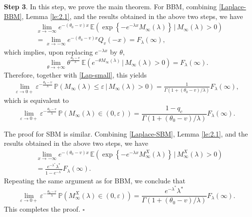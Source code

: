 \documentclass[11pt]{article}
\numberwithin{equation}{section}
\def\qed{\hfill$\square$\smallskip}
\begin{document}
{\bf Step 3}. In this step, we prove the main theorem. For BBM, combining \eqref{Laplace-BBM}, Lemma \ref{le:2.1}, and the results obtained in the above two steps, we have
\begin{align*}
	&\lim_{x \to -\infty} e^{-(\theta_0 - v)x} \, \mathbb{E}\left( \exp\left\{ -e^{-\lambda x} M_\infty(\lambda) \right\} \,\Big|\, M_\infty(\lambda) > 0 \right) \\
	&= 
	\lim_{x \to -\infty} e^{-(\theta_0 - v)x} Q_v(-x)=F_\lambda(\infty),
\end{align*}
which implies, upon replacing $e^{-\lambda x}$ by $\theta$,
\[
\lim_{\theta \to +\infty} \theta^{\frac{\theta_0 - v}{\lambda}} \, \mathbb{E}\left( e^{-\theta M_\infty(\lambda)} \,\Big|\, M_\infty(\lambda) > 0 \right)
=
F_\lambda(\infty).
\]
Therefore, together with \eqref{Lap-small}, this yields
\begin{align*}
	\lim_{\varepsilon \to 0+} \varepsilon^{-\frac{\theta_0 - v}{\lambda}} \, \mathbb{P}\left( M_\infty(\lambda) \leq \varepsilon \,\big|\, M_\infty(\lambda) > 0 \right)
	= 
	\frac{1}{\Gamma(1 + (\theta_0-v)/\lambda)}
	F_\lambda(\infty),
\end{align*}
which is equivalent to
\[
\lim_{\varepsilon \to 0+} \varepsilon^{-\frac{\theta_0 - v}{\lambda}} \, \mathbb{P}\left( M_\infty(\lambda) \in (0, \varepsilon) \right)
= 
\frac{1-q_c}{\Gamma(1 + (\theta_0-v)/\lambda)} 
F_\lambda(\infty).
\]

The proof for SBM is similar. Combining \eqref{Laplace-SBM}, Lemma \ref{le:2.1}, and the results obtained in the above two steps, we have
\begin{align*}
	&\lim_{x \to -\infty} e^{-(\theta_0 - v)x} \, \mathbb{E}\left( \exp\left\{ -e^{-\lambda x} M_\infty^X(\lambda) \right\} \,\Big|\, M_\infty^X(\lambda) > 0 \right) \\
	&= \frac{e^{-\lambda^*} \lambda^*}{1 - e^{-\lambda^*}} F_\lambda(\infty).
\end{align*}
Repeating the same argument as for BBM, we conclude that
\[
\lim_{\varepsilon \to 0+} \varepsilon^{-\frac{\theta_0 - v}{\lambda}} \, \mathbb{P}\left( M_\infty^X(\lambda) \in (0, \varepsilon) \right)
= \frac{e^{-\lambda^*} \lambda^*}{\Gamma(1 + 
	(\theta_0-v)/\lambda
	)} F_\lambda(\infty).
\]
This completes the proof.
\qed



\bigskip
\noindent

	
\end{document}
